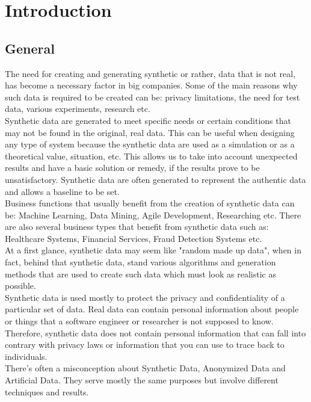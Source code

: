 \chapter{Introduction}
\section{General}
The need for creating and generating synthetic or rather, data that is not real, has become a necessary factor in big companies. Some of the main reasons why such data is required to be created can be: privacy limitations, the need for test data, various experiments, research etc.\\
\newline
Synthetic data are generated to meet specific needs or certain conditions that may not be found in the original, real data. This can be useful when designing any type of system because the synthetic data are used as a simulation or as a theoretical value, situation, etc. This allows us to take into account unexpected results and have a basic solution or remedy, if the results prove to be unsatisfactory. Synthetic data are often generated to represent the authentic data and allows a baseline to be set. \cite{SyntheticDataUsefulness}\\
\newline
Business functions that usually benefit from the creation of synthetic data can be: Machine Learning, Data Mining, Agile Development, Researching etc. There are also several business types that benefit from synthetic data such as: Healthcare Systems, Financial Services, Fraud Detection Systems etc. \cite{AIMultipleSyntheticData}\\
\newline
At a first glance, synthetic data may seem like "random made up data", when in fact, behind that synthetic data, stand various algorithms and generation methods that are used to create such data which must look as realistic as possible.\\
Synthetic data is used mostly to protect the privacy and confidentiality of a particular set of data. Real data can contain personal information about people or things that a software engineer or researcher is not supposed to know. Therefore, synthetic data does not contain personal information that can fall into contrary with privacy laws or information that you can use to trace back to individuals.\\
\newline
There's often a misconception about Synthetic Data, Anonymized Data and Artificial Data. They serve mostly the same purposes but involve different techniques and results.\\ 
